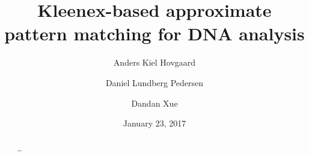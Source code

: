 \documentclass[a4paper,11pt]{article}
\title{Kleenex-based approximate pattern matching for DNA analysis}
\author{Anders Kiel Hovgaard \and Daniel Lundberg Pedersen \and Dandan Xue}
\date{January 23, 2017}
\theoremstyle{definition}
\begin{document}
\maketitle

\begin{abstract}
  \dots
\end{abstract}








\newpage


\end{document}
